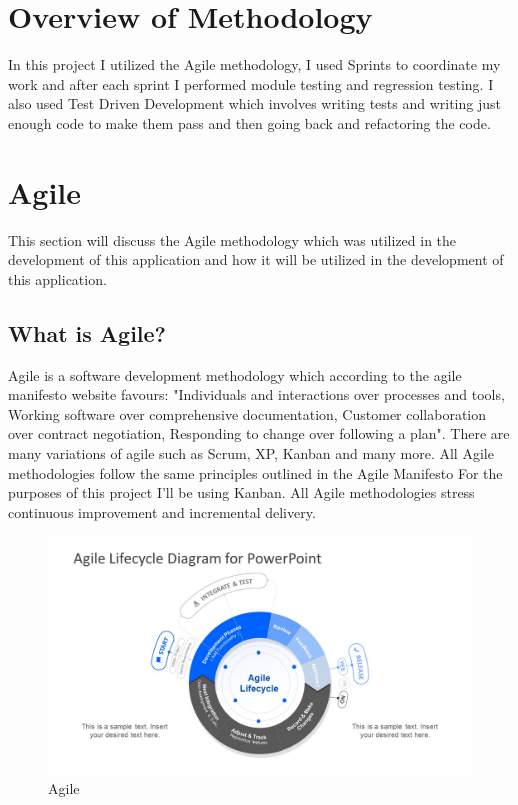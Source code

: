 \section{Overview of Methodology}
In this project I utilized the Agile methodology, I used Sprints to coordinate my work and after each sprint I performed
module testing and regression testing.  I also used Test Driven Development which involves writing tests and writing just
enough code to make them pass and then going back and refactoring the code.
\section{Agile}
This section will discuss the Agile methodology which was utilized in the development of this application and how it will be utilized in the development of this application.
\subsection{What is Agile?}
Agile is a software development methodology which according to the agile manifesto website \cite{Agile} favours: "Individuals and interactions over processes and tools,
Working software over comprehensive documentation,
Customer collaboration over contract negotiation,
Responding to change over following a plan".  There are many variations of agile \cite{VariationsofAgile} such as Scrum, XP, Kanban and many more. All Agile methodologies follow the same principles outlined in the Agile Manifesto\cite{Agile} For the purposes of this project I'll be using Kanban.  All Agile methodologies stress
continuous improvement and incremental delivery.
\begin{figure}[h!]
  \includegraphics[width=\textwidth]{img/agile.jpg}
  \caption{Agile}
  \label{fig: Image of Agile Lifecycle}
\end{figure}
\\
\cite{AgileImage}
